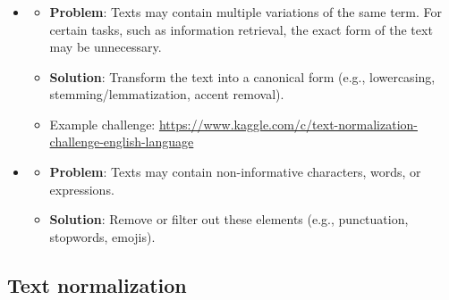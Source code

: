 \documentclass[xcolor=table]{beamer}
\begin{document}
\begin{frame}
	\frametitle{\insertshortsubtitle}
	\framesubtitle{\insertsection}
	
	\begin{itemize}
		\item {}
		\begin{itemize}
			\item \textbf{Problem}: Texts may contain multiple variations of the same term. For certain tasks, such as information retrieval, the exact form of the text may be unnecessary.
			\item \textbf{Solution}: Transform the text into a canonical form (e.g., lowercasing, stemming/lemmatization, accent removal).
			\item Example challenge: \url{https://www.kaggle.com/c/text-normalization-challenge-english-language}
		\end{itemize}
		\item {}
		\begin{itemize}
			\item \textbf{Problem}: Texts may contain non-informative characters, words, or expressions.
			\item \textbf{Solution}: Remove or filter out these elements (e.g., punctuation, stopwords, emojis).
		\end{itemize}
	\end{itemize}

\end{frame}

\subsection{Text normalization}
\end{document}
